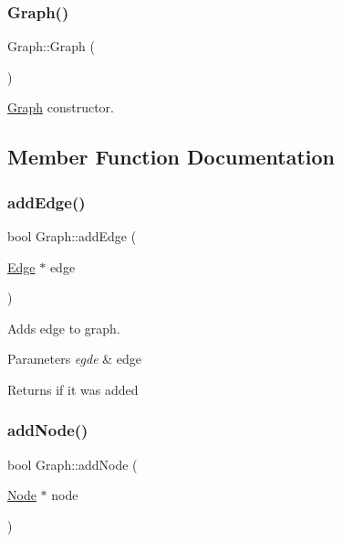 \subsubsection{\texorpdfstring{Graph()}{Graph()}}
{\footnotesize\ttfamily Graph\+::\+Graph (\begin{DoxyParamCaption}{ }\end{DoxyParamCaption})\hspace{0.3cm}{\ttfamily [inline]}}

\mbox{\hyperlink{class_graph}{Graph}} constructor. 

\subsection{Member Function Documentation}
\mbox{\label{class_graph_ae89cdc4fa0cc56d265ca7488f8bfa72c}} 
\subsubsection{\texorpdfstring{add\+Edge()}{addEdge()}}
{\footnotesize\ttfamily bool Graph\+::add\+Edge (\begin{DoxyParamCaption}\item[{\mbox{\hyperlink{class_edge}{Edge}} $\ast$}]{edge }\end{DoxyParamCaption})\hspace{0.3cm}{\ttfamily [inline]}}



Adds edge to graph. 


\begin{DoxyParams}{Parameters}
{\em egde} & edge \\
\hline
\end{DoxyParams}
\begin{DoxyReturn}{Returns}
if it was added 
\end{DoxyReturn}
\mbox{\label{class_graph_ae89c94dba0a869ea715299c5d009a755}} 
\subsubsection{\texorpdfstring{add\+Node()}{addNode()}}
{\footnotesize\ttfamily bool Graph\+::add\+Node (\begin{DoxyParamCaption}\item[{\mbox{\hyperlink{class_node}{Node}} $\ast$}]{node }\end{DoxyParamCaption})\hspace{0.3cm}{\ttfamily [inline]}}



